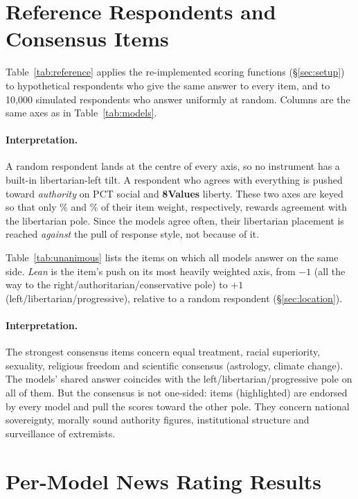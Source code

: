 \documentclass[11pt]{article}
\newcommand{\instEV}[1]{\textcolor{cEV}{\textbf{#1}}}
\newcommand{\ev}{\instEV{8Values}\xspace}
\begin{document}
\section{Reference Respondents and Consensus Items}
\label{app:location}

Table~\ref{tab:reference} applies the re-implemented scoring functions (\S\ref{sec:setup}) to hypothetical respondents who give the same answer to every item, and to 10{,}000 simulated respondents who answer uniformly at random. Columns are the same axes as in Table~\ref{tab:models}.


\paragraph{Interpretation.} A random respondent lands at the centre of every axis, so no instrument has a built-in libertarian-left tilt. A respondent who agrees with everything is pushed toward \emph{authority} on PCT social and \ev liberty. These two axes are keyed so that only \nKeyBalPctSoc\% and \nKeyBalEvGovt\% of their item weight, respectively, rewards agreement with the libertarian pole. Since the models agree often, their libertarian placement is reached \emph{against} the pull of response style, not because of it.

\medskip
Table~\ref{tab:unanimous} lists the \nNUnanItems{} items on which all \nNModels{} models answer on the same side. \emph{Lean} is the item's push on its most heavily weighted axis, from $-1$ (all the way to the right/authoritarian/conservative pole) to $+1$ (left/libertarian/progressive), relative to a random respondent (\S\ref{sec:location}).


\paragraph{Interpretation.} The strongest consensus items concern equal treatment, racial superiority, sexuality, religious freedom and scientific consensus (astrology, climate change). The models' shared answer coincides with the left/libertarian/progressive pole on all of them. But the consensus is not one-sided: \nUnanItemsNeg{} items (highlighted) are endorsed by every model and pull the scores toward the other pole. They concern national sovereignty, morally sound authority figures, institutional structure and surveillance of extremists.

\section{Per-Model News Rating Results}
\label{app:news}
\end{document}
